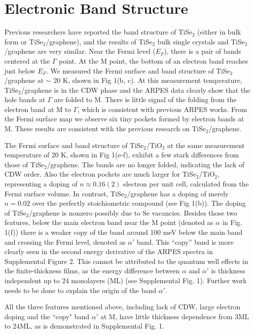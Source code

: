 \documentclass[journal=nalefd,manuscript=letter]{achemso}
\begin{document}
\section{Electronic Band Structure}
Previous researchers have reported the band structure of TiSe$_2$ (either in bulk form or TiSe$_2$/graphene)\cite{Rossnagel02prb, ChenChiang15}, and the results of TiSe$_2$ bulk single crystals and TiSe$_2$/graphene are very similar.
Near the Fermi level ($E_F$), there is a pair of bands centered at the $\Gamma$ point.
At the M point, the bottom of an electron band reaches just below $E_F$.
We measured the Fermi surface and band structure of TiSe$_2$/graphene at $\sim$ 20 K, shown in Fig 1(b, c).
At this measurement temperature, TiSe$_2$/graphene is in the CDW phase and the ARPES data clearly show that the hole bands at $\Gamma$ are folded to M. There is little signal of the folding from the electron band at M to $\Gamma$, which is consistent with previous ARPES works\cite{Rossnagel02prb, ChenChiang15}.
From the Fermi surface map we observe six tiny pockets formed by electron bands at M.
These results are consistent with the previous research on TiSe$_2$/graphene\cite{ChenChiang15,SugawaraTakahashi16,ChenChiang16}.

The Fermi surface and band structure of TiSe$_2$/TiO$_2$ at the same measurement temperature of 20 K, shown in Fig 1(e-f), exhibit a few stark differences from those of TiSe$_2$/graphene.
The bands are no longer folded, indicating the lack of CDW order.
Also the electron pockets are much larger for TiSe$_2$/TiO$_2$, representing a doping of $n\approx0.16(2)$ electron per unit cell, calculated from the Fermi surface volume.
In contrast, TiSe$_2$/graphene has a doping of merely $n = 0.02$ over the perfectly stoichiometric compound (see Fig 1(b)). The doping of TiSe$_2$/graphene is nonzero possibly due to Se vacancies.
Besides those two features, below the main electron band near the M point (denoted as $\alpha$ in Fig. 1(f)) there is a weaker copy of the band around 100 meV below the main band and crossing the Fermi level, denoted as $\alpha'$ band.
This ``copy'' band is more clearly seen in the second energy derivative of the ARPES spectra in Supplemental Figure 2.
This cannot be attributed to the quantum well effects in the finite-thickness films, as the energy difference between $\alpha$ and $\alpha'$ is thickness independent up to 24 monolayers (ML) (see Supplemental Fig. 1).
Further work needs to be done to explain the origin of the band $\alpha'$.

All the three features mentioned above, including lack of CDW, large electron doping and the ``copy" band $\alpha'$ at M, have little thickness dependence from 3ML to 24ML, as is demonstrated in Supplemental Fig. 1.
\end{document}
